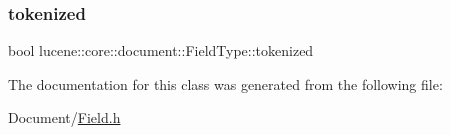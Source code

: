 \mbox{\label{classlucene_1_1core_1_1document_1_1FieldType_abe04c4af1aafbe73f3e1a0333f08cfd8}} 
\subsubsection{\texorpdfstring{tokenized}{tokenized}}
{\footnotesize\ttfamily bool lucene\+::core\+::document\+::\+Field\+Type\+::tokenized\hspace{0.3cm}{\ttfamily [private]}}



The documentation for this class was generated from the following file\+:\begin{DoxyCompactItemize}
\item 
Document/\mbox{\hyperlink{Document_2Field_8h}{Field.\+h}}\end{DoxyCompactItemize}
